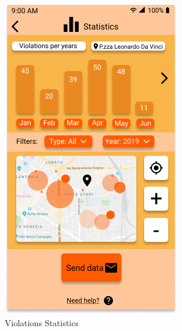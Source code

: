 \documentclass{article}
\begin{document}
\begin{figure}[H]
    \begin{subfigure}{0.5\textwidth}
        \includegraphics[width=0.9\linewidth]{img/mockups/statistics_authority_violations.png} 
        \caption{Violations Statistics}
        \label{fig:subim1}
    \end{subfigure}
    \begin{subfigure}{0.5\textwidth}

\end{subfigure}
\end{figure}
\end{document}
